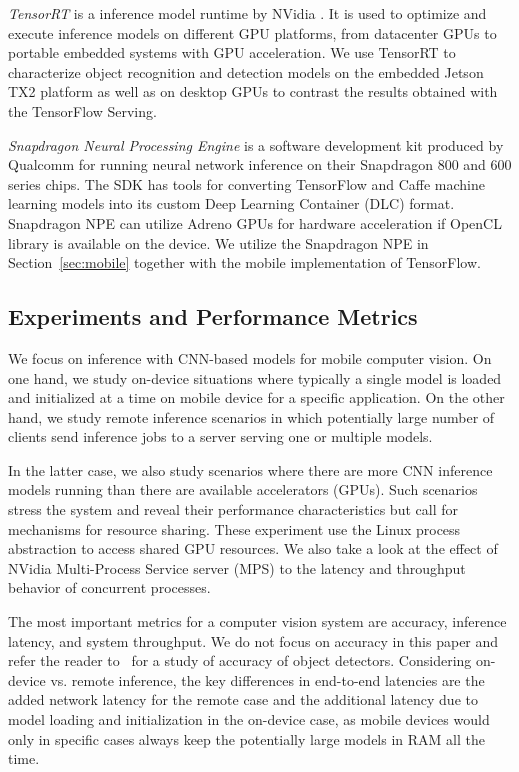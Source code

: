 \documentclass[sigconf]{acmart}
\begin{document}
\textit{TensorRT} is a inference model runtime by NVidia \cite{tensorrt}. It is used to optimize and execute inference models on different GPU platforms, from datacenter GPUs to portable embedded systems with GPU acceleration. We use TensorRT to characterize object recognition and detection models on the embedded Jetson TX2 platform as well as on desktop GPUs to contrast the results obtained with the TensorFlow Serving.

\textit{Snapdragon Neural Processing Engine}\cite{snpe} is a software development kit produced by Qualcomm for running neural network inference on their Snapdragon 800 and 600 series chips. The SDK has tools for converting TensorFlow and Caffe machine learning models into its custom Deep Learning Container (DLC) format. Snapdragon NPE can utilize Adreno GPUs for hardware acceleration if OpenCL library is available on the device. We utilize the Snapdragon NPE in Section~\ref{sec:mobile} together with the mobile implementation of TensorFlow.

\subsection{Experiments and Performance Metrics}

We focus on inference with CNN-based models for mobile computer vision. On one hand, we study on-device situations where typically a single model is loaded and initialized at a time on mobile device for a specific application. On the other hand, we study remote inference scenarios in which potentially large number of clients send inference jobs to a server serving one or multiple models. 

In the latter case, we also study scenarios where there are more CNN inference models running than there are available accelerators (GPUs). Such scenarios stress the system and reveal their performance characteristics but call for mechanisms for resource sharing.
These experiment use the Linux process abstraction to access shared GPU resources.
We also take a look at the effect of NVidia Multi-Process Service server (MPS)\cite{mps} to the latency and throughput behavior of concurrent processes.


The most important metrics for a computer vision system are accuracy, inference latency, and system throughput.
We do not focus on accuracy in this paper and refer the reader to~\cite{Huang2017CVPR} for a study of accuracy of object detectors. Considering on-device vs. remote inference, the key differences in end-to-end latencies are the added network latency for the remote case and the additional latency due to model loading and initialization in the on-device case, as mobile devices would only in specific cases always keep the potentially large models in RAM all the time.
\end{document}
